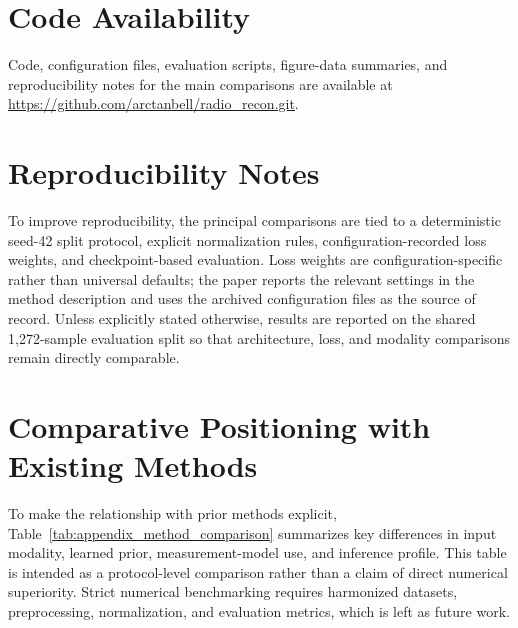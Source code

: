 \documentclass[twocolumn]{aastex631}
\begin{document}
\section{Code Availability}

Code, configuration files, evaluation scripts, figure-data summaries, and reproducibility notes for the main comparisons are available at \url{https://github.com/arctanbell/radio_recon.git}.

\appendix

\section{Reproducibility Notes}
\label{sec:appendix_repro}

To improve reproducibility, the principal comparisons are tied to a deterministic seed-42 split protocol, explicit normalization rules, configuration-recorded loss weights, and checkpoint-based evaluation.
Loss weights are configuration-specific rather than universal defaults; the paper reports the relevant settings in the method description and uses the archived configuration files as the source of record.
Unless explicitly stated otherwise, results are reported on the shared 1,272-sample evaluation split so that architecture, loss, and modality comparisons remain directly comparable.

\section{Comparative Positioning with Existing Methods}
\label{sec:appendix_comparison}

To make the relationship with prior methods explicit, Table~\ref{tab:appendix_method_comparison} summarizes key differences in input modality, learned prior, measurement-model use, and inference profile.
This table is intended as a protocol-level comparison rather than a claim of direct numerical superiority.
Strict numerical benchmarking requires harmonized datasets, preprocessing, normalization, and evaluation metrics, which is left as future work.
\end{document}

